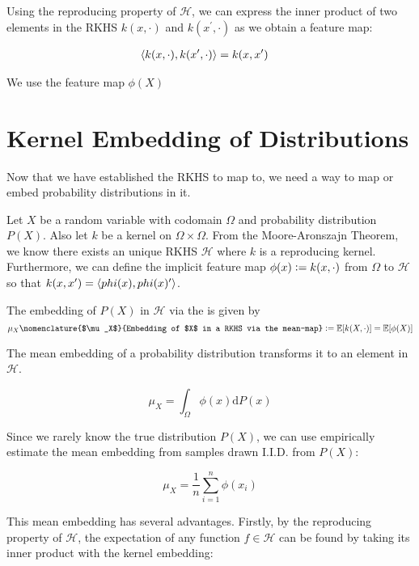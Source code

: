 Using the reproducing property of $\mathcal{H}$, we can express the inner product of two elements in the RKHS $k(x, \cdot)$ and $k(x^\prime, \cdot)$ as we obtain a feature map:

\begin{align}
	\langle k(x, \cdot), k(x^\prime, \cdot)\rangle &= k(x, x^\prime)
\end{align}

We use the feature map $\phi(X)$



\section{Kernel Embedding of Distributions}
Now that we have established the RKHS to map to, we need a way to map or embed probability distributions in it.

Let $X$ be a random variable with codomain $\Omega$ and probability distribution $P(X)$. Also let $k$ be a kernel on $\Omega \times \Omega$. From the Moore-Aronszajn Theorem, we know there exists an unique RKHS $\mathcal{H}$ where $k$ is a reproducing kernel. Furthermore, we can define the implicit feature map $\phi(x) \vcentcolon= k(x, \cdot)$ from $\Omega$ to $\mathcal{H}$ so that $k(x, x^\prime) = \langle phi(x), phi(x)^\prime\rangle$.

\begin{definition}
The embedding of $P(X)$ in $\mathcal{H}$ via the  is given by
\begin{equation}
  \mu_{X}\nomenclature{$\mu_X$}{Embedding of $X$ in a RKHS via the mean-map} \defeq \E[k(X, \cdot)] = \E[\phi(X)]
\end{equation}
\end{definition}

The mean embedding of a probability distribution transforms it to an element in $\mathcal{H}$.

\begin{equation}
  \mu_{X} = \int_\Omega \phi(x) \mathrm{d}P(x)
\end{equation}

Since we rarely know the true distribution $P(X)$, we can use empirically estimate the mean embedding from samples drawn I.I.D. from $P(X)$:

\begin{equation}
\mu_{X} = \frac{1}{n} \sum_{i=1}^n \phi(x_i)
\end{equation}

This mean embedding has several advantages. Firstly, by the reproducing property of $\mathcal{H}$, the expectation of any function $f \in \mathcal{H}$ can be found by taking its inner product with the kernel embedding:

